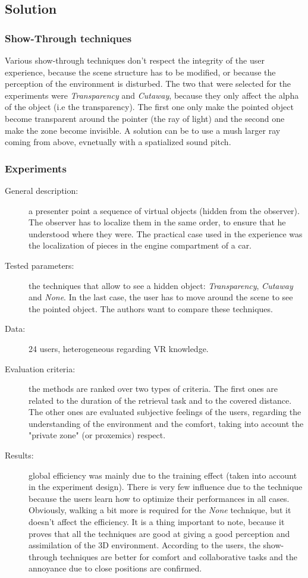 \documentclass[a4paper]{article}
\begin{document}
\subsection{Solution}

\subsubsection{Show-Through techniques}
Various show-through techniques don't respect the integrity of the user experience, because the scene structure has to be modified, or because the perception of the environment is disturbed. The two that were selected for the experiments were \textit{Transparency} and \textit{Cutaway}, because they only affect the alpha of the object (i.e the transparency). The first one only make the pointed object become transparent around the pointer (the ray of light) and the second one make the zone become invisible.
A solution can be to use a mush larger ray coming from above, evnetually with a spatialized sound pitch.

\subsubsection{Experiments}
\begin{description}
	\item[General description:] a presenter point a sequence of virtual objects (hidden from the observer). The observer has to localize them in the same order, to ensure that he understood where they were. The practical case used in the experience was the localization of pieces in the engine compartment of a car.
	\item[Tested parameters:] the techniques that allow to see a hidden object: \textit{Transparency}, \textit{Cutaway} and \textit{None}. In the last case, the user has to move around the scene to see the pointed object. The authors want to compare these techniques.
	\item[Data:] 24 users, heterogeneous regarding VR knowledge.
	\item[Evaluation criteria:] the methods are ranked over two types of criteria. The first ones are related to the duration of the retrieval task and to the covered distance. The other ones are evaluated subjective feelings of the users, regarding the understanding of the environment and the comfort, taking into account the "private zone" (or proxemics) respect.
	\item[Results:] global efficiency was mainly due to the training effect (taken into account in the experiment design). There is very few influence due to the technique because the users learn how to optimize their performances in all cases. Obviously, walking a bit more is required for the \textit{None} technique, but it doesn't affect the efficiency. It is a thing important to note, because it proves that all the techniques are good at giving a good perception and assimilation of the 3D environment. According to the users, the show-through techniques are better for comfort and collaborative tasks and the annoyance due to close positions are confirmed.
\end{description}
\end{document}
